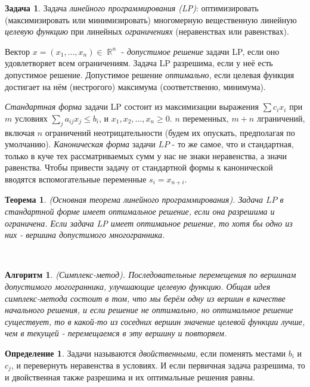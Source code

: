 \documentclass[a4paper]{article}
\theoremstyle{indented}
\newtheorem{theorem}{Теорема}
\newtheorem{alg}{Алгоритм}
\theoremstyle{definition}
\newtheorem{defn}{Определение}
\newtheorem{prob}{Задача}
\theoremstyle{remark}
\DeclareMathOperator{\RR}{\mathbb{R}}
\begin{document}
\begin{prob}
    Задача \textit{линейного программирования (LP)}: оптимизировать (максимизировать или минимизировать) многомерную вещественную линейную \textit{целевую функцию} при линейных \textit{ограничениях} (неравенствах или равенствах). \ 

    Вектор $x = (x_1, \ldots, x_n) \in \RR^n$ - \textit{допустимое решение} задачи LP, если оно удовлетворяет всем ограничениям. Задача LP разрешима, если у неё есть допустимое решение. Допустимое решение \textit{оптимально}, если целевая функция достигает на нём (нестрогого) максимума (соответственно, минимума). \ 

    \textit{Стандартная форма} задачи LP состоит из максимизации выражения $\sum c_i x_i$ при $m$ условиях $\sum_j a_{ij}x_j \leq b_i$, и $x_1, x_2, \ldots, x_n \geq 0$. $n$ переменных, $m+n$ лграничений, включая $n$ ограничений неотрицательности (будем их опускать, предполагая по умолчанию). \textit{Каноническая форма} задачи $LP$ - то же самое, что и стандартная, только в куче тех рассматриваемых сумм у нас не знаки неравенства, а значи равенства. Чтобы привести задачу от стандартной формы к канонической вводятся вспомогательные переменные $s_i = x_{n+i}$. 
\end{prob}

\begin{theorem}
    (Основная теорема линейного программирования). Задача $LP$ в стандартной форме имеет оптимальное решение, если она разрешима и ограничена. Если задача LP имеет оптимаьное решение, то хотя бы одно из них - вершина допустимого многогранника.
\end{theorem} \

\begin{alg}
    (Симплекс-метод). Последовательные перемещения по вершинам допустимого могогранника, улучшающие целевую функцию. Общая идея симплекс-метода состоит в том, что мы берём одну из вершин в качестве начального решения, и если решение не оптимально, но оптимальное решение существует, то в какой-то из соседних вершин значение целевой функции лучше, чем в текущей - перемещаемся в эту вершину и повторяем. 
\end{alg}

\begin{defn}
    Задачи называются \textit{двойственными}, если поменять местами $b_i$ и $c_j$, и перевернуть неравенства в условиях. И если первичная задача разрешима, то и двойственная также разрешима и их оптимальные решения равны.
\end{defn}
\end{document}
